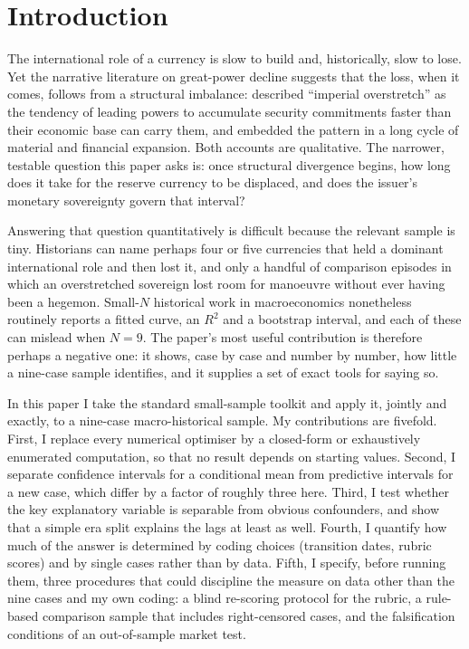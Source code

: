\documentclass[11pt,letterpaper]{article}
\theoremstyle{definition}
\theoremstyle{plain}
\begin{document}
\section{Introduction}\label{sec:intro}
The international role of a currency is slow to build and, historically, slow to lose. Yet the narrative literature on great-power decline suggests that the loss, when it comes, follows from a structural imbalance: \citet{kennedy1987} described ``imperial overstretch'' as the tendency of leading powers to accumulate security commitments faster than their economic base can carry them, and \citet{arrighi1994} embedded the pattern in a long cycle of material and financial expansion. Both accounts are qualitative. The narrower, testable question this paper asks is: once structural divergence begins, how long does it take for the reserve currency to be displaced, and does the issuer's monetary sovereignty govern that interval?

Answering that question quantitatively is difficult because the relevant sample is tiny. Historians can name perhaps four or five currencies that held a dominant international role and then lost it, and only a handful of comparison episodes in which an overstretched sovereign lost room for manoeuvre without ever having been a hegemon. Small-$N$ historical work in macroeconomics nonetheless routinely reports a fitted curve, an $R^2$ and a bootstrap interval, and each of these can mislead when $N=9$. The paper's most useful contribution is therefore perhaps a negative one: it shows, case by case and number by number, how little a nine-case sample identifies, and it supplies a set of exact tools for saying so.

In this paper I take the standard small-sample toolkit and apply it, jointly and exactly, to a nine-case macro-historical sample. My contributions are fivefold. First, I replace every numerical optimiser by a closed-form or exhaustively enumerated computation, so that no result depends on starting values. Second, I separate confidence intervals for a conditional mean from predictive intervals for a new case, which differ by a factor of roughly three here. Third, I test whether the key explanatory variable is separable from obvious confounders, and show that a simple era split explains the lags at least as well. Fourth, I quantify how much of the answer is determined by coding choices (transition dates, rubric scores) and by single cases rather than by data. Fifth, I specify, before running them, three procedures that could discipline the measure on data other than the nine cases and my own coding: a blind re-scoring protocol for the rubric, a rule-based comparison sample that includes right-censored cases, and the falsification conditions of an out-of-sample market test.
\end{document}
